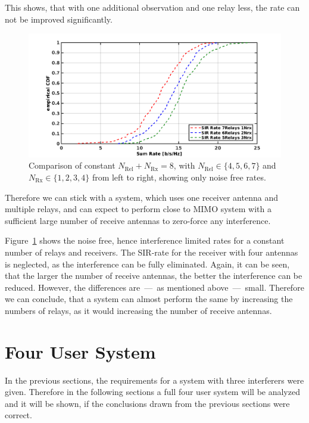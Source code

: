 This shows, that with one additional observation and one relay less, the rate can not be improved significantly.
\begin{figure}[h]
\centering
  \includegraphics[width=0.9\linewidth]{images/ConstNrelNrx8comparison_1Rx_onlySIR.png}
\caption{Comparison of constant $N_\text{Rel} + N_{\text{Rx}} = 8$, with $N_\text{Rel}\in\{4,5,6,7\}$ and $N_{\text{Rx}}\in\{1,2,3,4\}$ from left to right, showing only noise free rates.}
\label{fig:1user_const_SIR}
\end{figure}
Therefore we can stick with a system, which uses one receiver antenna and multiple relays, and can expect to perform close to MIMO system with a sufficient large number of receive antennas to zero-force any interference.

Figure~\ref{fig:1user_const_SIR} shows the noise free, hence interference limited rates for a constant number of relays and receivers.
The SIR-rate for the receiver with four antennas is neglected, as the interference can be fully eliminated.
Again, it can be seen, that the larger the number of receive antennas, the better the interference can be reduced.
However, the differences are~---~as mentioned above~---~small.
Therefore we can conclude, that a system can almost perform the same by increasing the numbers of relays, as it would increasing the number of receive antennas.


\section{Four User System}
In the previous sections, the requirements for a system with three interferers were given.
Therefore in the following sections a full four user system will be analyzed and it will be shown, if the conclusions drawn from the previous sections were correct.

